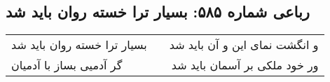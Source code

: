 \begin{center}
\section*{رباعی شماره ۵۸۵: بسیار ترا خسته روان باید شد}
\label{sec:0585}
\begin{longtable}{l p{0.5cm} r}
بسیار ترا خسته روان باید شد
&&
و انگشت نمای این و آن باید شد
\\
گر آدمیی بساز با آدمیان
&&
ور خود ملکی بر آسمان باید شد
\\
\end{longtable}
\end{center}
